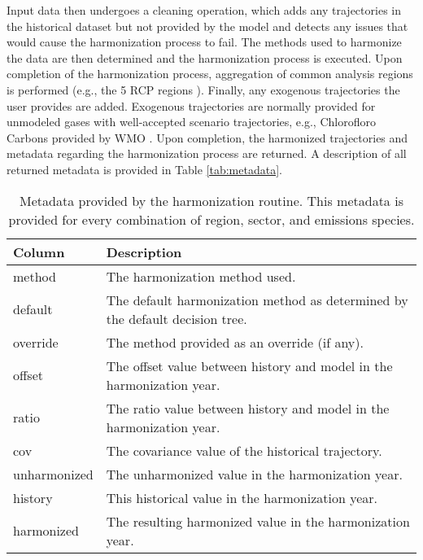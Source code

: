 Input data then undergoes a cleaning operation, which adds any trajectories in
the historical dataset but not provided by the model and detects any issues that
would cause the harmonization process to fail. The methods used to harmonize the
data are then determined and the harmonization process is executed. Upon
completion of the harmonization process, aggregation of common analysis regions
is performed (e.g., the 5 RCP regions ). Finally, any exogenous
trajectories the user provides are added. Exogenous trajectories are normally
provided for unmodeled gases with well-accepted scenario trajectories, e.g.,
Chlorofloro Carbons provided by WMO . Upon completion, the harmonized
trajectories and metadata regarding the harmonization process are returned. A
description of all returned metadata is provided in Table \ref{tab:metadata}.

\begin{table}[]
\centering
\caption{Metadata provided by the  harmonization routine. This metadata is provided for every combination of region, sector, and emissions species.}
\label{my-tab:metadata}
\begin{tabular}{|p{2cm}|p{8cm}|}
\hline
Column       & Description                                                                  \\
\hline
\hline
method       & The harmonization method used.                                               \\
\hline
default      & The default harmonization method as determined by the default decision tree. \\
\hline
override     & The method provided as an override (if any).                                 \\
\hline
offset       & The offset value between history and model in the harmonization year.        \\
\hline
ratio        & The ratio value between history and model in the harmonization year.         \\
\hline
cov          & The covariance value of the historical trajectory.                           \\
\hline
unharmonized & The unharmonized value in the harmonization year.                            \\
\hline
history      & This historical value in the harmonization year.                             \\
\hline
harmonized   & The resulting harmonized value in the harmonization year.\\
\hline
\end{tabular}
\end{table}


